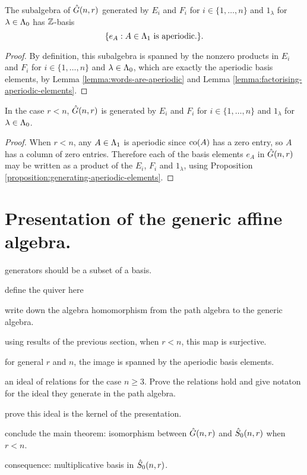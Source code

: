 \documentclass[a4paper, 11pt]{report}
\begin{document}
\begin{proposition}\label{proposition:generating-aperiodic-elements}
The subalgebra of $\hat{G}(n,r)$ generated by $E_i$ and $F_i$ for $i\in\{1,\ldots,n\}$ and $1_\lambda$ for $\lambda\in\Lambda_0{}$ has $\mathbb{Z}$-basis
\begin{equation*}
\{e_A:A\in\Lambda_1{}\text{ is aperiodic.}\}.
\end{equation*}
\end{proposition}

\begin{proof}
By definition, this subalgebra is spanned by the nonzero products in $E_i$ and $F_i$ for $i\in\{1,\ldots,n\}$ and $\lambda\in\Lambda_0{}$, which are exactly the aperiodic basis elements, by Lemma \ref{lemma:words-are-aperiodic} and Lemma \ref{lemma:factorising-aperiodic-elements}.
\end{proof}

\begin{lemma}
In the case $r<n$, $\hat{G}(n,r)$ is generated by $E_i$ and $F_i$ for $i\in\{1,\ldots,n\}$ and $1_\lambda$ for $\lambda\in\Lambda_0{}$.
\end{lemma}

\begin{proof}
When $r<n$, any $A\in\Lambda_1{}$ is aperiodic since $\operatorname{co}(A)$ has a zero entry, so $A$ has a column of zero entries. Therefore each of the basis elements $e_A$ in $\hat{G}(n,r)$ may be written as a product of the $E_i$, $F_i$ and $1_\lambda$, using Proposition \ref{proposition:generating-aperiodic-elements}.
\end{proof}


\section{Presentation of the generic affine algebra.}

{\color{brown}
generators should be a subset of a basis.

define the quiver here

write down the algebra homomorphism from the path algebra to the generic algebra.

using results of the previous section, when $r<n$, this map is surjective.

for general $r$ and $n$, the image is spanned by the aperiodic basis elements.

an ideal of relations for the case $n\geq 3$. Prove the relations hold and give notaton for the ideal they generate in the path algebra.

prove this ideal is the kernel of the presentation.

conclude the main theorem: isomorphism between $\hat{G}(n,r)$ and $\hat{S}_0(n,r)$ when $r<n$.

consequence: multiplicative basis in $\hat{S}_0(n,r)$.
}
\end{document}
